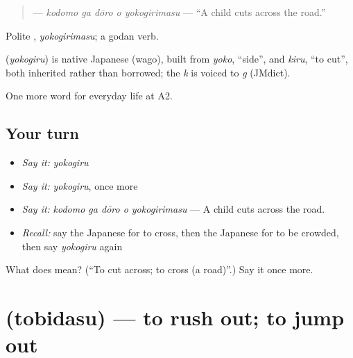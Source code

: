 \begin{quote}
\textbf{  } — \emph{kodomo ga dōro o yokogirimasu} — \textquotedblleft{}A child cuts across the road.\textquotedblright{}
\end{quote}

Polite \textbf{}, \emph{yokogirimasu}; a godan verb.

\begin{cousinweb}
\textbf{} (\emph{yokogiru}) is native Japanese (wago), built from \emph{yoko}, \textquotedblleft{}side\textquotedblright{}, and \emph{kiru}, \textquotedblleft{}to cut\textquotedblright{}, both inherited rather than borrowed; the \emph{k} is voiced to \emph{g} (JMdict).
\end{cousinweb}

\begin{grammarlens}[title={What you've built}]
One more word for everyday life at A2.
\end{grammarlens}

\subsection*{Your turn}
\begin{itemize}
\raggedright
  \item \emph{Say it:} \emph{yokogiru}
  \item \emph{Say it:} \emph{yokogiru}, once more
  \item \emph{Say it:} \emph{kodomo ga dōro o yokogirimasu} — A child cuts across the road.
  \item \emph{Recall:} say the Japanese for to cross, then the Japanese for to be crowded, then say \emph{yokogiru} again
\end{itemize}

\begin{tcolorbox}[breakable,colback=teal!4,colframe=teal!35!black,title={Before you move on}]
What does  mean? (\textquotedblleft{}To cut across; to cross (a road)\textquotedblright{}.) Say it once more.
\end{tcolorbox}
\section[\texorpdfstring{\ja{とびだす} (tobidasu)}{とびだす (tobidasu)}]{ (tobidasu) — to rush out; to jump out}

\label{lesson:JA-C201-tobidasu}



